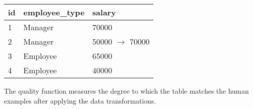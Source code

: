 \begin{table}[ht!]
\centering
\label{my-label}
\begin{tabular}{|l|l|l|}
\hline
\rowcolor[HTML]{000000} 
{\color[HTML]{FFFFFF} id}  & {\color[HTML]{FFFFFF} employee\_type}            & {\color[HTML]{FFFFFF} salary}   \\ \hline
1 & Manager                                & 70000                                  \\ \hline
2 & Manager                                    & 50000 $\rightarrow$ 70000                                \\ \hline
3 & Employee                                    & 65000                                  \\ \hline
4 & Employee                                & 40000                                  \\ \hline
\end{tabular}
\end{table}
The quality function measures the degree to which the table matches the human examples after applying the data transformations.






